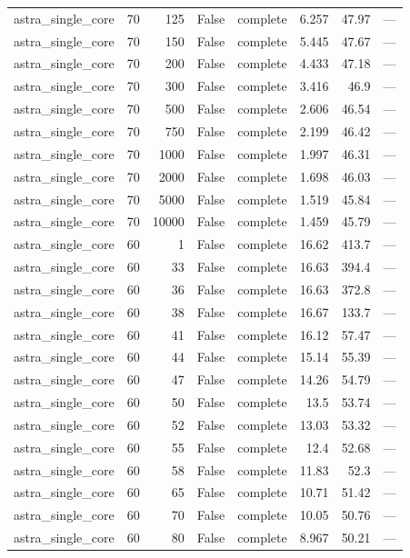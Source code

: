 \begin{tabular}{lrrrlrrl}
astra\_single\_core & 70 & 125 & False & complete & 6.257 & 47.97 & — \\
astra\_single\_core & 70 & 150 & False & complete & 5.445 & 47.67 & — \\
astra\_single\_core & 70 & 200 & False & complete & 4.433 & 47.18 & — \\
astra\_single\_core & 70 & 300 & False & complete & 3.416 & 46.9 & — \\
astra\_single\_core & 70 & 500 & False & complete & 2.606 & 46.54 & — \\
astra\_single\_core & 70 & 750 & False & complete & 2.199 & 46.42 & — \\
astra\_single\_core & 70 & 1000 & False & complete & 1.997 & 46.31 & — \\
astra\_single\_core & 70 & 2000 & False & complete & 1.698 & 46.03 & — \\
astra\_single\_core & 70 & 5000 & False & complete & 1.519 & 45.84 & — \\
astra\_single\_core & 70 & 10000 & False & complete & 1.459 & 45.79 & — \\
astra\_single\_core & 60 & 1 & False & complete & 16.62 & 413.7 & — \\
astra\_single\_core & 60 & 33 & False & complete & 16.63 & 394.4 & — \\
astra\_single\_core & 60 & 36 & False & complete & 16.63 & 372.8 & — \\
astra\_single\_core & 60 & 38 & False & complete & 16.67 & 133.7 & — \\
astra\_single\_core & 60 & 41 & False & complete & 16.12 & 57.47 & — \\
astra\_single\_core & 60 & 44 & False & complete & 15.14 & 55.39 & — \\
astra\_single\_core & 60 & 47 & False & complete & 14.26 & 54.79 & — \\
astra\_single\_core & 60 & 50 & False & complete & 13.5 & 53.74 & — \\
astra\_single\_core & 60 & 52 & False & complete & 13.03 & 53.32 & — \\
astra\_single\_core & 60 & 55 & False & complete & 12.4 & 52.68 & — \\
astra\_single\_core & 60 & 58 & False & complete & 11.83 & 52.3 & — \\
astra\_single\_core & 60 & 65 & False & complete & 10.71 & 51.42 & — \\
astra\_single\_core & 60 & 70 & False & complete & 10.05 & 50.76 & — \\
astra\_single\_core & 60 & 80 & False & complete & 8.967 & 50.21 & — \\

\end{tabular}
